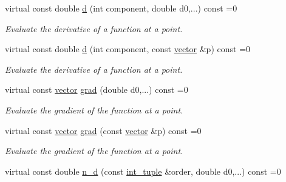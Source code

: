 \begin{DoxyCompactItemize}
virtual const double \hyperlink{classsisl_1_1function_a520bfaebbd09c1d8678a129c548d4b1a}{d} (int component, double d0,...) const =0
\begin{DoxyCompactList}\small\item\em Evaluate the derivative of a function at a point. \end{DoxyCompactList}\item 
\mbox{\label{classsisl_1_1function_a43aca1cd5bfa726e687c6cbe16d2c0e3}} 
virtual const double \hyperlink{classsisl_1_1function_a43aca1cd5bfa726e687c6cbe16d2c0e3}{d} (int component, const \hyperlink{namespacesisl_a2069bd5374a9be042ff3ce3306d41e1a}{vector} \&p) const =0
\begin{DoxyCompactList}\small\item\em Evaluate the derivative of a function at a point. \end{DoxyCompactList}\item 
\mbox{\label{classsisl_1_1function_a7db0b15b30f7a7fedf6a3bed021ca56a}} 
virtual const \hyperlink{namespacesisl_a2069bd5374a9be042ff3ce3306d41e1a}{vector} \hyperlink{classsisl_1_1function_a7db0b15b30f7a7fedf6a3bed021ca56a}{grad} (double d0,...) const =0
\begin{DoxyCompactList}\small\item\em Evaluate the gradient of the function at a point. \end{DoxyCompactList}\item 
\mbox{\label{classsisl_1_1function_ad967b1e86a0b7ebaf9f1da9508052adf}} 
virtual const \hyperlink{namespacesisl_a2069bd5374a9be042ff3ce3306d41e1a}{vector} \hyperlink{classsisl_1_1function_ad967b1e86a0b7ebaf9f1da9508052adf}{grad} (const \hyperlink{namespacesisl_a2069bd5374a9be042ff3ce3306d41e1a}{vector} \&p) const =0
\begin{DoxyCompactList}\small\item\em Evaluate the gradient of the function at a point. \end{DoxyCompactList}\item 
\mbox{\label{classsisl_1_1function_ab4cdf43f4187c937813f8184e347a9c9}} 
virtual const double \hyperlink{classsisl_1_1function_ab4cdf43f4187c937813f8184e347a9c9}{n\+\_\+d} (const \hyperlink{namespacesisl_adc492e1c166a136d08b283394d81cd71}{int\+\_\+tuple} \&order, double d0,...) const =0

\end{DoxyCompactItemize}
